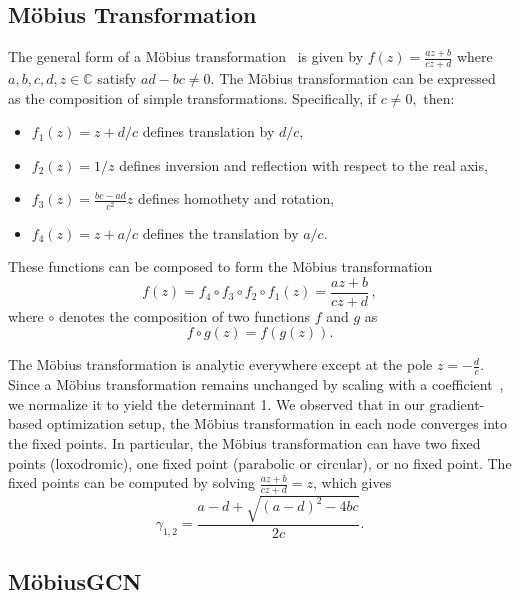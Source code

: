 \documentclass[runningheads]{llncs}
\begin{document}
\subsection{M\"{o}bius Transformation}
The general form of a M\"{o}bius transformation~\cite{mandic2009complex} is given by
$f(z) = \frac{az+b}{cz+d}$ where $a, b, c, d, z \in \mathbb{C}$ satisfy $ad - bc \ne 0$. The M\"{o}bius transformation can be expressed as the composition of simple transformations.
Specifically, if $ c\neq 0,$ then:
\begin{itemize}
\itemsep0em
    \item $f_{1}(z)=z+d/c$ defines translation by $d/c$,
    \item $ f_{2}(z)=1/z$  defines inversion and reflection with respect to the real axis,
    \item $f_{3}(z)={\frac {bc-ad}{c^{2}}}z$ defines homothety and rotation,
    \item $f_{4}(z)=z+a/c$ defines the translation by $a/c$.
\end{itemize}
These functions can be composed to form the M\"obius transformation
\begin{equation*}
f(z) = f_{4}\circ f_{3}\circ f_{2}\circ f_{1}(z) = {\frac {az+b}{cz+d}}\,,
\end{equation*}
where $\circ$ denotes the composition of two functions $f$ and $g$ as
\begin{equation*}
    f \circ g(z) = f(g(z)).
\end{equation*}

 The M\"obius transformation is analytic everywhere except at the pole $z = -\frac{d}{c}$. 
 Since a M\"{o}bius transformation remains unchanged by scaling with a coefficient~\cite{mandic2009complex}, we normalize it to yield the determinant 1. 
We observed that in our gradient-based optimization setup, the M\"{o}bius transformation in each node converges into the fixed points. In particular, the M\"obius transformation can have two fixed points (loxodromic), one fixed point (parabolic or circular), or no fixed point. The fixed points can be computed by solving $\frac{az + b}{cz + d} = z$, which gives 
\begin{equation*}
    \gamma_{1,2} = \frac{a - d + \sqrt{(a-d)^2 - 4bc}}{2c}.
\end{equation*}



\subsection{M\"obiusGCN}
\end{document}
